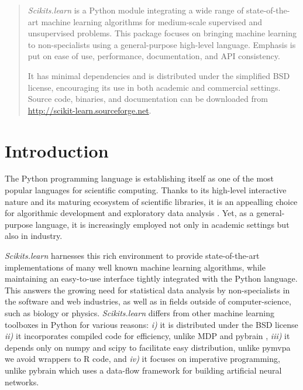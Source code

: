 \documentclass[twoside,11pt]{article}
\begin{document}

\maketitle

\begin{abstract}
%
\emph{Scikits.learn} is a Python module integrating a wide range of
state-of-the-art machine learning algorithms for medium-scale supervised
and unsupervised problems. This package focuses on bringing machine
learning to non-specialists using a general-purpose high-level language.
Emphasis is put on ease of use, performance, documentation, and API
consistency.

%
It has minimal dependencies and is distributed under the simplified BSD
license, encouraging its use in both academic and commercial settings.
Source code, binaries, and documentation can be downloaded from
\url{http://scikit-learn.sourceforge.net}.

\end{abstract}





\section{Introduction}

The Python programming language is establishing itself as one of the
most popular languages for scientific computing. Thanks to its
high-level interactive nature and its maturing ecosystem of scientific
libraries, it is an appealling choice for algorithmic development and
exploratory data analysis \citep{cise2007,cise2011}. Yet, as a
general-purpose language, it is increasingly employed not only in academic
settings but also in industry.

{\sl Scikits.learn} harnesses this rich environment to provide state-of-the-art
implementations of
many well known machine learning algorithms, while maintaining an
easy-to-use interface tightly integrated with the Python language. This answers the
growing need for statistical data analysis by non-specialists in the software and web
industries, as well as in fields outside of computer-science, such as biology or physics.
\emph{Scikits.learn} differs from other machine learning toolboxes in Python for
various reasons: \emph{i)} it is distributed under the BSD license
\emph{ii)} it incorporates compiled code for efficiency, unlike MDP
\citep{zito2008} and pybrain \citep{schaul2010}, \emph{iii)} it depends
only on numpy and scipy to facilitate easy distribution, unlike pymvpa
\citep{hanke2009} we avoid wrappers to R code, and \emph{iv)} it focuses on imperative
programming, unlike pybrain which uses a data-flow framework
for building artificial neural networks.
\end{document}
